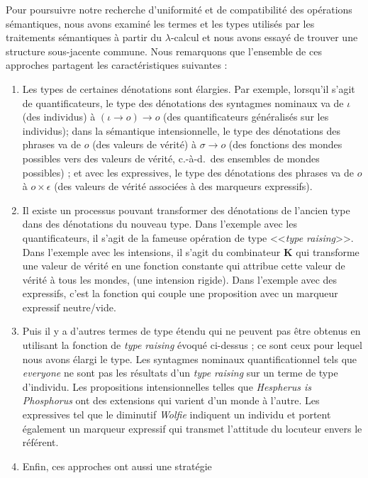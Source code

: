 Pour poursuivre notre recherche d'uniformité et de compatibilité des opérations
sémantiques, nous avons examiné les termes et les types utilisés par les
traitements sémantiques à partir du $\lambda$-calcul et nous avons essayé de trouver
une structure sous-jacente commune. Nous remarquons que l'ensemble de ces 
approches partagent les caractéristiques suivantes :

\begin{enumerate}
\item \label{item:french-type-transformation} Les types de certaines 
  dénotations sont élargies. Par exemple, lorsqu'il s'agit de quantificateurs,
  le type des dénotations des syntagmes nominaux va de $\iota$ (des individus) à
  $(\iota \to o) \to o$ (des quantificateurs généralisés sur les individus);
  dans la sémantique intensionnelle, le type des dénotations des phrases va de $o$
  (des valeurs de vérité) à $\sigma \to o$ (des fonctions des mondes possibles
  vers des valeurs de vérité, c.-à-d.\ des ensembles de mondes possibles) ; et
  avec les expressives, le type des dénotations des phrases va de $o$ à $o \times
  \epsilon$ (des valeurs de vérité associées à des marqueurs expressifs).
\item \label{item:french-monad-eta} Il existe un processus pouvant transformer des
  dénotations de l'ancien type dans des dénotations du nouveau type. Dans
  l'exemple avec les quantificateurs, il s'agit de la fameuse opération de type 
  <<\textit{type raising}>>. Dans l'exemple avec les intensions,
  il s'agit du combinateur $\textbf{K}$ qui transforme une valeur de vérité en
  une fonction constante qui attribue cette valeur de vérité à tous les mondes,
  (une intension rigide). Dans l'exemple avec des expressifs, c'est la fonction
  qui couple une proposition avec un marqueur expressif neutre/vide.
\item Puis il y a d'autres termes de type étendu qui ne peuvent pas être obtenus
  en utilisant la fonction de \textit{type raising} évoqué ci-dessus ; ce sont
  ceux pour lequel nous avons élargi le type. Les syntagmes nominaux
  quantificationnel tels que \emph{everyone} ne sont pas les résultats d'un
  \textit{type raising} sur un terme de type d'individu. Les propositions
  intensionnelles telles que \emph{Hespherus is Phosphorus} ont des extensions
  qui varient d'un monde à l'autre. Les expressives tel que le diminutif
  \emph{Wolfie} indiquent un individu et portent également un marqueur expressif
  qui transmet l'attitude du locuteur envers le référent.
\item \label{item:french-monad-mu} Enfin, ces approches ont aussi une stratégie 

\end{enumerate}
